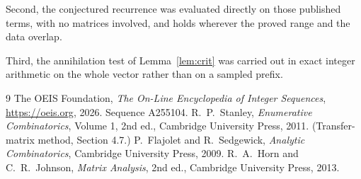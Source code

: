 \documentclass[11pt,a4paper]{article}
\theoremstyle{plain}
\theoremstyle{definition}
\begin{document}
Second, the conjectured recurrence was evaluated directly on those published terms, with no
matrices involved, and holds wherever the proved range and the data overlap.

Third, the annihilation test of Lemma~\ref{lem:crit} was carried out in exact integer
arithmetic on the whole vector rather than on a sampled prefix.

\begin{thebibliography}{9}
 The OEIS Foundation, \emph{The On-Line Encyclopedia of Integer
Sequences}, \url{https://oeis.org}, 2026. Sequence A255104.
 R.~P.~Stanley, \emph{Enumerative Combinatorics}, Volume 1, 2nd ed.,
Cambridge University Press, 2011. (Transfer-matrix method, Section 4.7.)
 P.~Flajolet and R.~Sedgewick, \emph{Analytic Combinatorics}, Cambridge
University Press, 2009.
 R.~A.~Horn and C.~R.~Johnson, \emph{Matrix Analysis}, 2nd ed., Cambridge
University Press, 2013.
\end{thebibliography}
\end{document}
